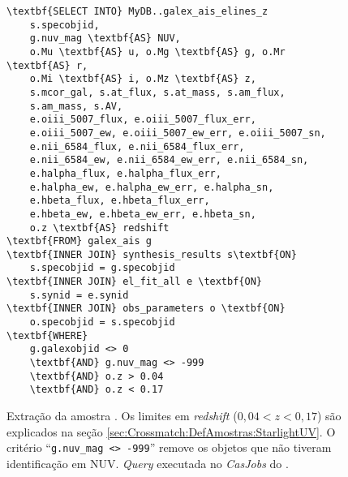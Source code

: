 \begin{figure}
\begin{Verbatim}[frame=single,commandchars=\\\{\}]
\textbf{SELECT INTO} MyDB..galex_ais_elines_z
	s.specobjid,
	g.nuv_mag \textbf{AS} NUV,
	o.Mu \textbf{AS} u, o.Mg \textbf{AS} g, o.Mr \textbf{AS} r,
	o.Mi \textbf{AS} i, o.Mz \textbf{AS} z,
	s.mcor_gal, s.at_flux, s.at_mass, s.am_flux,
	s.am_mass, s.AV,
	e.oiii_5007_flux, e.oiii_5007_flux_err,
	e.oiii_5007_ew, e.oiii_5007_ew_err, e.oiii_5007_sn,
	e.nii_6584_flux, e.nii_6584_flux_err,
	e.nii_6584_ew, e.nii_6584_ew_err, e.nii_6584_sn,
	e.halpha_flux, e.halpha_flux_err,
	e.halpha_ew, e.halpha_ew_err, e.halpha_sn,
	e.hbeta_flux, e.hbeta_flux_err,
	e.hbeta_ew, e.hbeta_ew_err, e.hbeta_sn,
	o.z \textbf{AS} redshift
\textbf{FROM} galex_ais g
\textbf{INNER JOIN} synthesis_results s\textbf{ON}
	s.specobjid = g.specobjid
\textbf{INNER JOIN} el_fit_all e \textbf{ON}
	s.synid = e.synid
\textbf{INNER JOIN} obs_parameters o \textbf{ON}
	o.specobjid = s.specobjid
\textbf{WHERE}
	g.galexobjid <> 0
	\textbf{AND} g.nuv_mag <> -999
	\textbf{AND} o.z > 0.04
	\textbf{AND} o.z < 0.17
\end{Verbatim}
	\caption[Extração da amostra \starlightUV.]
	{Extração da amostra \starlightUV. Os limites em {\em redshift}
	($0,04 < z < 0,17$) são explicados na seção
	\ref{sec:Crossmatch:DefAmostras:StarlightUV}. O critério ``\texttt{g.nuv\_mag <>
	-999}'' remove os objetos que não tiveram identificação em NUV. {\em Query}
	executada no {\em CasJobs} do \starlight.}
	\label{fig:QuerySampleAIS}
\end{figure}


